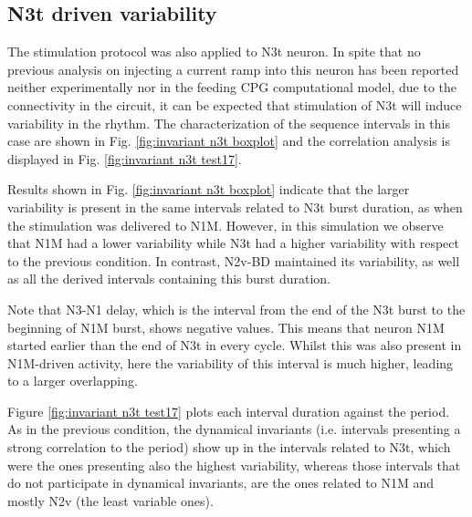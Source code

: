 \subsection{N3t driven variability}

The stimulation protocol was also applied to N3t neuron. In spite that no previous analysis on injecting a current ramp into this neuron has been reported neither experimentally nor in the feeding CPG computational model, due to the connectivity in the circuit, it can be expected that stimulation of N3t will induce variability in the rhythm. The characterization of the sequence intervals in this case are shown in Fig. 
\ref{fig:invariant n3t boxplot} and the correlation analysis is displayed in Fig. \ref{fig:invariant n3t test17}.


Results shown in Fig. \ref{fig:invariant n3t boxplot} indicate that the larger variability is present in the same intervals related to N3t burst duration, as when the stimulation was delivered to N1M. However, in this simulation we observe that N1M had a lower variability while N3t had a higher variability with respect to the previous condition. 
In contrast, N2v-BD maintained its variability, as well as all the derived intervals containing this burst duration.

Note that N3-N1 delay, which is the interval from the end of the N3t burst to the beginning of N1M burst, shows negative values. This means that neuron N1M started earlier than the end of N3t in every cycle. Whilst this was also present in N1M-driven activity, here the variability of this interval is much higher, leading to a larger overlapping.

Figure \ref{fig:invariant n3t test17} plots each interval duration against the period. As in the previous condition, the dynamical invariants (i.e. intervals presenting a strong correlation to the period) show up in the intervals related to N3t, which were the ones presenting also the highest variability, whereas those intervals that do not participate in dynamical invariants, are the ones related to N1M and mostly N2v (the least variable ones). 


